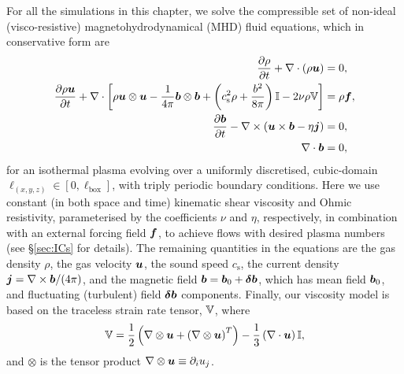 For all the simulations in this chapter, we solve the compressible set of non-ideal (visco-resistive) magnetohydrodynamical (MHD) fluid equations, which in conservative form are
\begin{align}
    \frac{\partial \rho}{\partial t}
        + \nabla\cdot(\rho \bm{u})
        &= 0
        , \label{mhd:continuity} \\
    \frac{\partial \rho\bm{u}}{\partial t}
        + \nabla\cdot\bigg[
            \rho\bm{u}\otimes\bm{u}
            - \frac{1}{4\pi}\bm{b}\otimes\bm{b}
            + \left( c_\mathrm{s}^2\rho + \frac{b^2}{8\pi} \right)\mathbb{I}
            - 2\nu\rho\mathbb{V}
        \bigg] &= \rho\bm{f}
        , \label{mhd:momentum} \\
    \frac{\partial \bm{b}}{\partial t}
        - \nabla\times\left( \bm{u}\times\bm{b} - \eta\bm{j} \right)
        &= 0
        , \label{mhd:induction} \\
    \nabla\cdot\bm{b}
        &= 0
        , \label{mhd:divb_free}
\end{align}
for an isothermal plasma evolving over a uniformly discretised, cubic-domain $\ell_{(x, y, z)} \in [0, \ell_\mathrm{box}]$, with triply periodic boundary conditions. Here we use constant (in both space and time) kinematic shear viscosity and Ohmic resistivity, parameterised by the coefficients $\nu$ and $\eta$, respectively, in combination with an external forcing field $\bm{f}$, to achieve flows with desired plasma numbers (see \S\ref{sec:ICs} for details). The remaining quantities in the equations are the gas density $\rho$, the gas velocity $\bm{u}$, the sound speed $c_\mathrm{s}$, the current density $\bm{j} = \nabla\times\bm{b} /(4\pi)$, and the magnetic field $\bm{b} = \bm{b}_0 + \bm{\delta b}$, which has mean field $\bm{b}_0$, and fluctuating (turbulent) field $\bm{\delta b}$ components. Finally, our viscosity model is based on the traceless strain rate tensor, $\mathbb{V}$, where
\begin{align}
    \mathbb{V}
        = \frac{1}{2} \left( 
                \nabla\otimes\bm{u}
                + \left( \nabla\otimes\bm{u} \right)^T
             \right)
            - \frac{1}{3} \left( \nabla\cdot\bm{u} \right) \mathbb{I}
        , \label{eqn:strain_rate_tensor}
\end{align}
and $\otimes$ is the tensor product $\nabla\otimes\bm{u} \equiv \partial _i u_j$.

